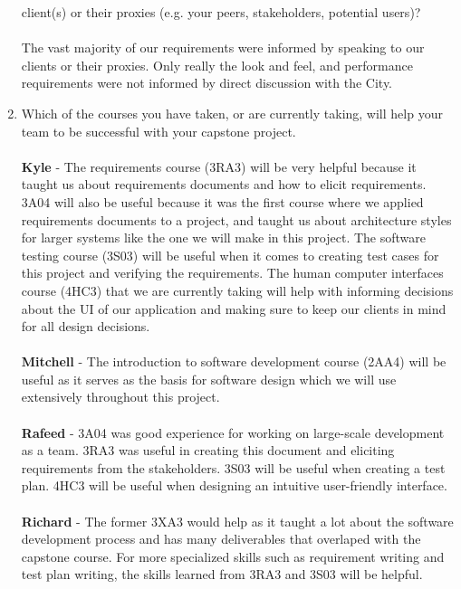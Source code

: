 \documentclass[12pt]{article}
\begin{document}
\begin{enumerate}
    client(s) or their proxies (e.g. your peers, stakeholders,
    potential users)? \\
    \\
    The vast majority of our requirements were informed by speaking
    to our clients or their proxies. Only really the look and feel,
    and performance requirements were not informed by direct
    discussion with the City. \\
  \item Which of the courses you have taken, or are currently taking,
    will help your team to be successful with your capstone project. \\
    \\
    \textbf{Kyle} - The requirements course (3RA3) will be very
    helpful because it taught us about requirements documents and how
    to elicit requirements. 3A04 will also be useful because it was
    the first course where we applied requirements documents to a
    project, and taught us about architecture styles for larger
    systems like the one we will make in this project. The software
    testing course (3S03) will be useful when it comes to creating
    test cases for this project and verifying the requirements. The
    human computer interfaces course (4HC3) that we are currently
    taking will help with informing decisions about the UI of our
    application and making sure to keep our clients in mind for all
    design decisions.\\
    \\
    \textbf{Mitchell} - The introduction to software development
    course (2AA4) will be useful as it serves as the basis for
    software design which we will use extensively throughout this project.\\
    \\
    \textbf{Rafeed} - 3A04 was good experience for working on
    large-scale development as a team. 3RA3 was useful in creating
    this document and eliciting requirements from the stakeholders.
    3S03 will be useful when creating a test plan. 4HC3 will be
    useful when designing an intuitive user-friendly interface. \\
    \\
    \textbf{Richard} - The former 3XA3 would help as it taught a lot about the
    software development process and has many deliverables that overlaped with
    the capstone course. For more specialized skills such as requirement writing
    and test plan writing, the skills learned from 3RA3 and 3S03 will be
    helpful.
    \\

\end{enumerate}
\end{document}
